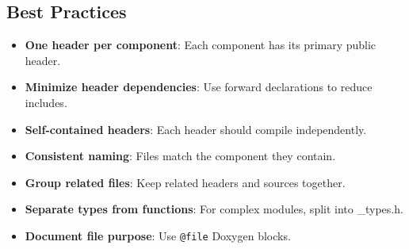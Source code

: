 \subsection{Best Practices}

\begin{itemize}
    \item \textbf{One header per component}: Each component has its primary public header.
    \item \textbf{Minimize header dependencies}: Use forward declarations to reduce includes.
    \item \textbf{Self-contained headers}: Each header should compile independently.
    \item \textbf{Consistent naming}: Files match the component they contain.
    \item \textbf{Group related files}: Keep related headers and sources together.
    \item \textbf{Separate types from functions}: For complex modules, split into \_types.h.
    \item \textbf{Document file purpose}: Use \texttt{@file} Doxygen blocks.
\end{itemize}

